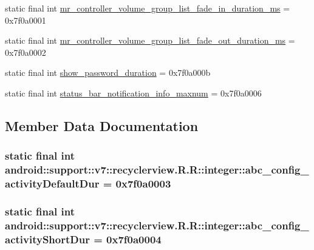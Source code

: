 \begin{CompactItemize}
static final int \hyperlink{classandroid_1_1support_1_1v7_1_1recyclerview_1_1_r_1_1integer_a5498b70ae7aaf85b665a358e572deea}{mr\_\-controller\_\-volume\_\-group\_\-list\_\-fade\_\-in\_\-duration\_\-ms} = 0x7f0a0001
\item 
static final int \hyperlink{classandroid_1_1support_1_1v7_1_1recyclerview_1_1_r_1_1integer_0247071bc4947cfbaf48a051dea65de1}{mr\_\-controller\_\-volume\_\-group\_\-list\_\-fade\_\-out\_\-duration\_\-ms} = 0x7f0a0002
\item 
static final int \hyperlink{classandroid_1_1support_1_1v7_1_1recyclerview_1_1_r_1_1integer_15fe4d52a61c045da91ac5716f6a03ad}{show\_\-password\_\-duration} = 0x7f0a000b
\item 
static final int \hyperlink{classandroid_1_1support_1_1v7_1_1recyclerview_1_1_r_1_1integer_7cfd73f037acc977ce4c5ec9282a34bb}{status\_\-bar\_\-notification\_\-info\_\-maxnum} = 0x7f0a0006
\end{CompactItemize}


\subsection{Member Data Documentation}
\hypertarget{classandroid_1_1support_1_1v7_1_1recyclerview_1_1_r_1_1integer_e1f10eedfab31a36c59bee2bc1a3ec7c}{
\subsubsection[{abc\_\-config\_\-activityDefaultDur}]{\setlength{\rightskip}{0pt plus 5cm}static final int android::support::v7::recyclerview.R.R::integer::abc\_\-config\_\-activityDefaultDur = 0x7f0a0003}}
\label{classandroid_1_1support_1_1v7_1_1recyclerview_1_1_r_1_1integer_e1f10eedfab31a36c59bee2bc1a3ec7c}


\hypertarget{classandroid_1_1support_1_1v7_1_1recyclerview_1_1_r_1_1integer_3944934b31b2147dac1a5c537ce167b3}{
\subsubsection[{abc\_\-config\_\-activityShortDur}]{\setlength{\rightskip}{0pt plus 5cm}static final int android::support::v7::recyclerview.R.R::integer::abc\_\-config\_\-activityShortDur = 0x7f0a0004}}
\label{classandroid_1_1support_1_1v7_1_1recyclerview_1_1_r_1_1integer_3944934b31b2147dac1a5c537ce167b3}


